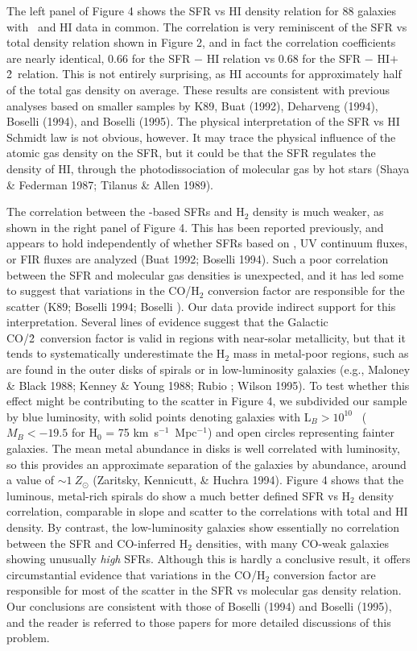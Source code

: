 The left panel of Figure 4 shows the SFR vs HI density relation for 88 galaxies
with \halpha\ and HI data in common.  The correlation is very reminiscent
of the SFR vs total density relation shown in Figure 2, and in fact
the correlation coefficients are nearly identical, 0.66 for the SFR $-$ HI
relation vs 0.68 for the SFR $-$ HI$+$\h2\ relation.  
This is not entirely surprising, as HI accounts for approximately
half of the total gas density on average.
These results are consistent with previous analyses based on smaller
samples by K89, Buat (1992), Deharveng \etal (1994), Boselli (1994),
and Boselli \etal (1995).  The physical
interpretation of the SFR vs HI Schmidt law is not obvious, however.  
It may trace the 
physical influence of the atomic gas density on the SFR, but it could
be that the SFR regulates the density of HI, through the photodissociation
of molecular gas by hot stars (Shaya \& Federman 1987; 
Tilanus \& Allen 1989).

The correlation between the \halpha-based SFRs and H$_2$ density is 
much weaker, as shown in the right panel of Figure 4.  This has
been reported previously, and appears to hold independently of whether
SFRs based on \halpha, UV continuum fluxes, or FIR fluxes are analyzed
(Buat 1992; Boselli 1994).  Such a poor correlation between the SFR and
molecular gas densities is unexpected, and it has led some to suggest 
that variations in the CO/H$_2$ conversion factor are responsible 
for the scatter (K89; Boselli 1994; Boselli
).  Our data provide indirect support for this interpretation.
Several lines of evidence suggest that the Galactic CO/\h2\ conversion
factor is valid in regions with near-solar metallicity, but that it tends to 
systematically
underestimate the H$_2$ mass in metal-poor regions, such as are found
in the outer disks of spirals or in low-luminosity galaxies
(e.g., Maloney \& Black 1988; Kenney \& Young 1988; Rubio ; 
Wilson 1995).  To test whether 
this effect might be contributing to the scatter in Figure 4, we
subdivided our sample by blue luminosity, with solid points denoting
galaxies with L$_B > 10^{10}$ \lsun\ ($M_B < -19.5$ for  
H$_0$ = 75 km~s$^{-1}$~Mpc$^{-1}$) and open circles representing fainter
galaxies.  The mean metal abundance in disks is well correlated with
luminosity, so this provides an approximate separation of the galaxies 
by abundance, around a value of $\sim 1~Z_\odot$ (Zaritsky,
Kennicutt, \& Huchra 1994).  Figure 4 shows that the luminous, metal-rich 
spirals do show a much
better defined SFR vs H$_2$ density correlation, comparable in 
slope and scatter to the correlations with total and HI density.
By contrast, the low-luminosity galaxies show essentially no correlation
between the SFR and CO-inferred H$_2$ densities, with many CO-weak
galaxies showing unusually {\it high} SFRs.  Although this is hardly
a conclusive result, it offers circumstantial evidence 
that variations in the CO/H$_2$ conversion factor are responsible for
most of the scatter in the SFR vs molecular gas density relation.
Our conclusions are consistent with those of 
Boselli (1994) and Boselli \etal (1995), and the reader is referred
to those papers for more detailed discussions of this problem.

